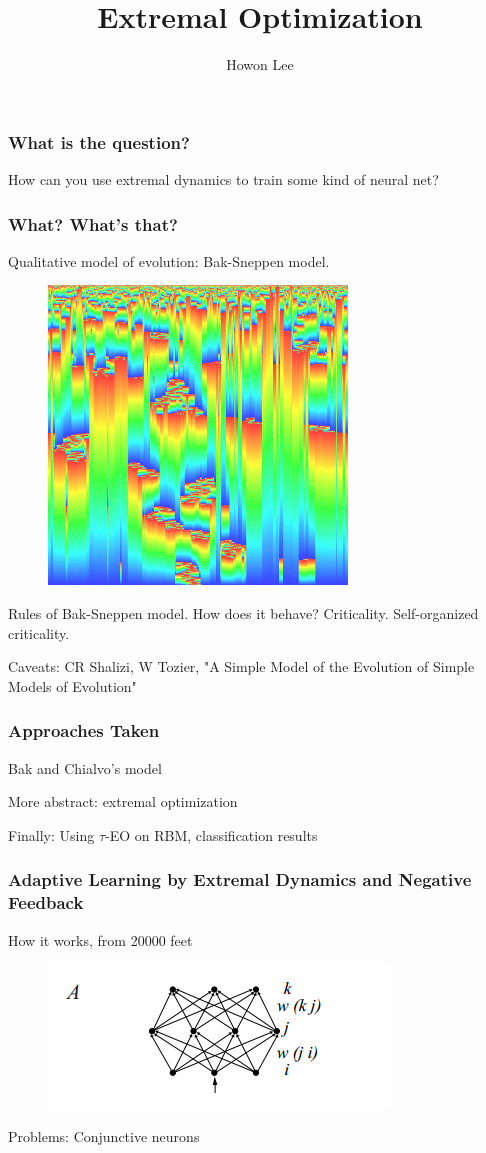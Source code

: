 \documentclass{beamer}
\begin{document}
\title{Extremal Optimization}
\author{Howon Lee}
\maketitle

\begin{frame}
  \frametitle{What is the question?}
  How can you use extremal dynamics to train some kind of neural net?
\end{frame}

\begin{frame}
  \frametitle{What? What's that?}
  Qualitative model of evolution: Bak-Sneppen model.
  \begin{figure}
    \includegraphics{bak_sneppen}
  \end{figure}

  Rules of Bak-Sneppen model. How does it behave? Criticality. Self-organized criticality.

  Caveats: CR Shalizi, W Tozier, "A Simple Model of the Evolution of Simple Models of Evolution"
\end{frame}

\begin{frame}
  \frametitle{Approaches Taken}
  Bak and Chialvo's model

  More abstract: extremal optimization

  Finally: Using $\tau$-EO on RBM, classification results
\end{frame}

\begin{frame}
  \frametitle{Adaptive Learning by Extremal Dynamics and Negative Feedback}
  How it works, from 20000 feet
  \begin{figure}
    \includegraphics{bak_chialvo_net_topology}
  \end{figure}

  Problems: Conjunctive neurons
\end{frame}
\end{document}
